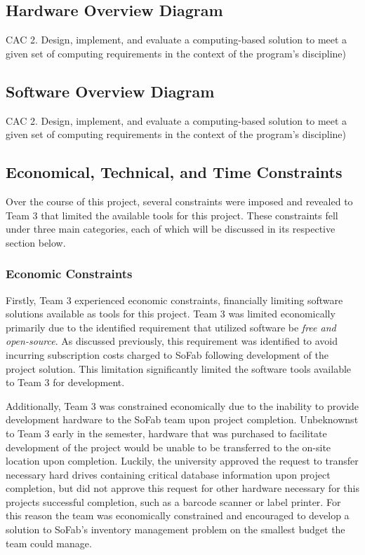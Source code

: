 \documentclass{article}
\begin{document}
\subsection{Hardware Overview Diagram} 
CAC 2. Design, implement, and evaluate a 
    computing-based solution to meet a given set of computing requirements in 
    the context of the program’s discipline) 

\subsection{Software Overview Diagram} 
CAC 2. Design, implement, and evaluate a 
    computing-based solution to meet a given set of computing requirements in the 
    context of the program’s discipline) 

\subsection{Economical, Technical, and Time Constraints}
Over the course of this project, several constraints were imposed and revealed to Team 3 that limited the available tools for this 
project. These constraints fell under three main categories, each of which will be discussed in its respective section below. 
\subsubsection{Economic Constraints}
Firstly, Team 3 experienced economic constraints, financially limiting software solutions available as tools for this project. Team 3 
was limited economically primarily due to the identified requirement that utilized software be \textit{free and open-source}. As 
discussed previously, this requirement was identified to avoid incurring subscription costs charged to SoFab following development of 
the project solution. This limitation significantly limited the software tools available to Team 3 for development. 

Additionally, Team 3 was constrained economically due to the inability to provide development hardware to the SoFab team upon project
completion. Unbeknownst to Team 3 early in the semester, hardware that was purchased to facilitate development of the project would be 
unable to be transferred to the on-site location upon completion. Luckily, the university approved the request to transfer necessary 
hard drives containing critical database information upon project completion, but did not approve this request for other hardware 
necessary for this projects successful completion, such as a barcode scanner or label printer. For this reason the team was economically 
constrained and encouraged to develop a solution to SoFab's inventory management problem on the smallest budget the team could manage. 
\end{document}
